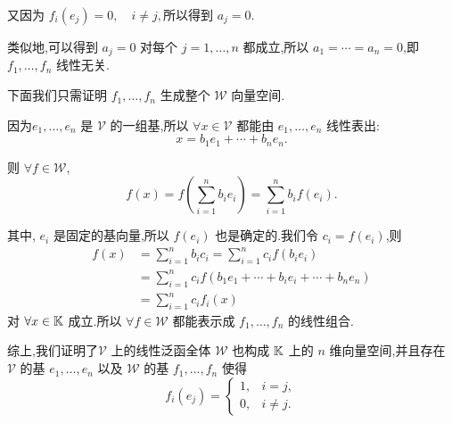 \begin{problem}
\begin{solution}
    又因为 $f_i(e_j) = 0, \quad i \ne j,$所以得到 $a_j = 0$.
    
    类似地,可以得到 $a_j = 0$ 对每个 $j = 1,\ldots,n$ 都成立,所以 $a_1 = \cdots = a_n = 0$,即 $f_1, \ldots, f_n$ 线性无关.

    下面我们只需证明 $f_1, \ldots, f_n$ 生成整个 $\mathcal{W}$ 向量空间.

    因为$e_1,\ldots,e_n$ 是 $\mathcal{V}$ 的一组基,所以 $\forall x \in \mathcal{V}$ 都能由 $e_1,\ldots,e_n$ 线性表出:
    \[
        x = b_1 e_1 + \cdots + b_n e_n.
    \]

    则 $\forall f \in \mathcal{W}$,
    \[
        f(x) = f\left(\sum_{i = 1}^{n} b_i e_i\right) = \sum_{i = 1}^{n} b_i f(e_i).
    \]

    其中, $e_i$ 是固定的基向量,所以 $f(e_i)$ 也是确定的.我们令 $c_i = f(e_i)$,则
    \begin{align*}
        f(x) &= \sum_{i = 1}^{n}b_i c_i
            = \sum_{i = 1}^{n} c_i f(b_i e_i) \\
            &= \sum_{i = 1}^{n} c_i f(b_1 e_1 + \cdots + b_i e_i + \cdots + b_n e_n) \\
            &= \sum_{i = 1}^{n} c_i f_i(x)
    \end{align*}
    对 $\forall x \in \mathbb{K}$ 成立.所以 $\forall f \in \mathcal{W}$ 都能表示成 $f_1,\ldots,f_n$ 的线性组合.

    综上,我们证明了$\mathcal V$ 上的线性泛函全体 $\mathcal W$ 也构成 $\mathbb{K}$ 上的 $n$ 维向量空间,并且存在 $\mathcal V$ 的基 $e_1,\dots,e_n$ 以及 $\mathcal W$ 的基 $f_1,\dots,f_n$ 使得
\[
    f_i(e_j)=
    \begin{cases}
        1, & i=j,\\
        0, & i\ne j.
    \end{cases} \]
\end{solution}
\end{problem}


